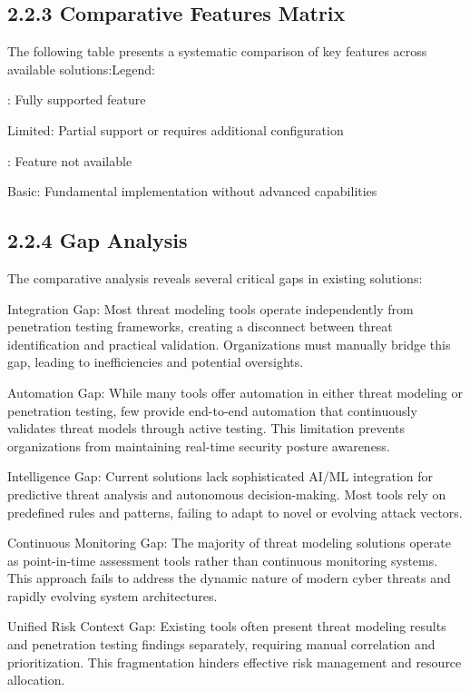 \documentclass[12pt,a4paper]{report}
\begin{document}
\subsection{2.2.3 Comparative Features Matrix}

The following table presents a systematic comparison of key features across available solutions:Legend:

\checkmark: Fully supported feature

Limited: Partial support or requires additional configuration

\times: Feature not available

Basic: Fundamental implementation without advanced capabilities

\subsection{2.2.4 Gap Analysis}

The comparative analysis reveals several critical gaps in existing solutions:

Integration Gap: Most threat modeling tools operate independently from penetration testing frameworks, creating a disconnect between threat identification and practical validation. Organizations must manually bridge this gap, leading to inefficiencies and potential oversights.

Automation Gap: While many tools offer automation in either threat modeling or penetration testing, few provide end-to-end automation that continuously validates threat models through active testing. This limitation prevents organizations from maintaining real-time security posture awareness.

Intelligence Gap: Current solutions lack sophisticated AI/ML integration for predictive threat analysis and autonomous decision-making. Most tools rely on predefined rules and patterns, failing to adapt to novel or evolving attack vectors.

Continuous Monitoring Gap: The majority of threat modeling solutions operate as point-in-time assessment tools rather than continuous monitoring systems. This approach fails to address the dynamic nature of modern cyber threats and rapidly evolving system architectures.

Unified Risk Context Gap: Existing tools often present threat modeling results and penetration testing findings separately, requiring manual correlation and prioritization. This fragmentation hinders effective risk management and resource allocation.
\end{document}

